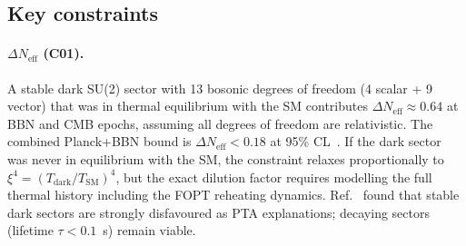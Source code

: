 \documentclass[12pt,a4paper]{article}
\begin{document}
\begin{table}[h]
\centering
{}
\caption{Summary of considered constraints. ``Resolved'' means the constraint was either checked and found to be satisfied or determined to be inapplicable for the minimal model.}
\label{tab:constraints}
\end{table}

\subsection{Key constraints}

\paragraph{$\Delta N_{\text{eff}}$ (C01).} A stable dark SU(2) sector with 13 bosonic degrees of freedom (4 scalar + 9 vector) that was in thermal equilibrium with the SM contributes $\Delta N_{\text{eff}} \approx 0.64$ at BBN and CMB epochs, assuming all degrees of freedom are relativistic. The combined Planck+BBN bound is $\Delta N_{\text{eff}} < 0.18$ at 95\% CL~\cite{Yeh:2022}. If the dark sector was never in equilibrium with the SM, the constraint relaxes proportionally to $\xi^4 = (T_{\text{dark}}/T_{\text{SM}})^4$, but the exact dilution factor requires modelling the full thermal history including the FOPT reheating dynamics. Ref.~\cite{Bringmann:2023} found that stable dark sectors are strongly disfavoured as PTA explanations; decaying sectors (lifetime $\tau < 0.1$~s) remain viable.
\end{document}
